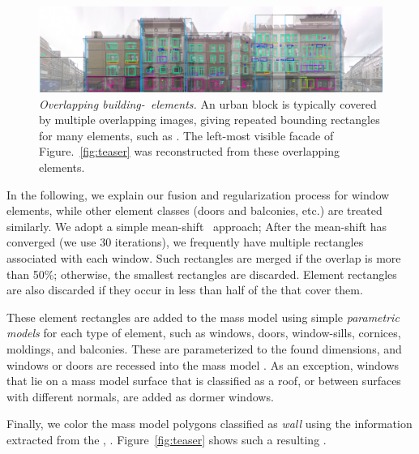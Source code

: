 \begin{figure}[t]
    \centering
    \includegraphics[width=\columnwidth]{../images/overlapping_features/overlapping_features.png}
    \caption{{\it Overlapping building-\facade\ elements.} An urban block is typically covered by multiple overlapping \facade images, giving repeated bounding rectangles for many elements, such as .
    The left-most visible facade of Figure.~\ref{fig:teaser} was reconstructed from these overlapping elements.}
    \label{fig:overlapping_features}
\end{figure}


In the following,
we explain our fusion and regularization process for window elements, while other element classes (doors and balconies, etc.) are treated similarly.
We adopt a simple mean-shift~\cite{mean-shift} approach;
%
After the mean-shift has converged (we use 30 iterations), we frequently have multiple rectangles associated with each window. Such rectangles are merged if the overlap is more than 50\%; otherwise, the smallest rectangles are discarded. Element rectangles are also discarded if they occur in less than half of the \streetimages that cover them. 
%


These element rectangles are added to the mass model using simple \emph{parametric models} for each type of element, such as windows, doors, window-sills, cornices, moldings, and balconies.
These are parameterized to the found dimensions, and windows or doors are recessed into the mass model \facade. As an exception, windows that lie on a mass model surface that is classified as a roof, or between surfaces with different normals, are added as dormer windows.



Finally, we color the mass model polygons classified as \emph{wall} using the information extracted from the \streetI, .
%
Figure~\ref{fig:teaser} shows such a resulting \outputM. 


